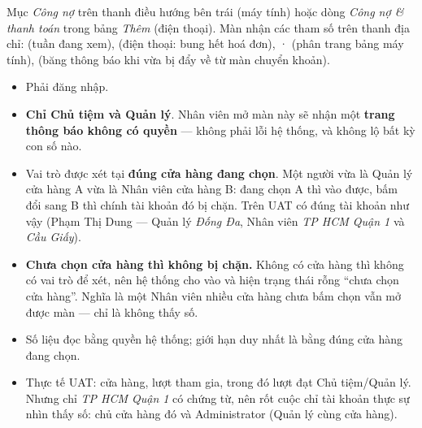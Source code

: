 \mvao

Mục \emph{Công nợ} trên thanh điều hướng bên trái (máy tính) hoặc dòng \emph{Công nợ \& thanh
toán} trong bảng \emph{Thêm} (điện thoại). Màn nhận các tham số trên thanh địa chỉ:
 (tuần đang xem),  (điện thoại: bung hết hoá đơn),  ·
 (phân trang bảng máy tính),  (băng thông báo khi vừa bị đẩy về từ
màn chuyển khoản).

\mai

\begin{itemize}[leftmargin=*]
  \item Phải đăng nhập.
  \item \textbf{Chỉ Chủ tiệm và Quản lý}. Nhân viên mở màn này sẽ nhận một \textbf{trang thông
        báo không có quyền} --- không phải lỗi hệ thống, và không lộ bất kỳ con số nào.
  \item Vai trò được xét tại \textbf{đúng cửa hàng đang chọn}. Một người vừa là Quản lý cửa
        hàng A vừa là Nhân viên cửa hàng B: đang chọn A thì vào được, bấm đổi sang B thì chính
        tài khoản đó bị chặn. Trên UAT có đúng  tài khoản như vậy (Phạm Thị Dung ---
        Quản lý \emph{Đống Đa}, Nhân viên \emph{TP HCM Quận 1} và \emph{Cầu Giấy}).
  \item \textbf{Chưa chọn cửa hàng thì không bị chặn.} Không có cửa hàng thì không có vai trò
        để xét, nên hệ thống cho vào và hiện trạng thái rỗng ``chưa chọn cửa hàng''. Nghĩa là
        một Nhân viên nhiều cửa hàng chưa bấm chọn vẫn mở được màn --- chỉ là không thấy số.
  \item Số liệu đọc bằng quyền hệ thống; giới hạn duy nhất là  bằng đúng cửa
        hàng đang chọn.
  \item Thực tế UAT:  cửa hàng,  lượt tham gia, trong đó  lượt đạt Chủ
        tiệm/Quản lý. Nhưng chỉ \emph{TP HCM Quận 1} có chứng từ, nên rốt cuộc chỉ  tài
        khoản thực sự nhìn thấy số: chủ cửa hàng đó và Administrator (Quản lý cùng cửa hàng).
\end{itemize}

\mhien

